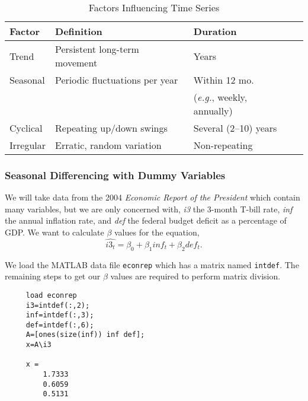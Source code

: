 \begin{table}[tbp]
	\centering
	\begin{tabular}{llll}
	\toprule
	Factor & Definition & Duration \\
	\hline
	Trend &  Persistent long-term movement & Years \\
	Seasonal & Periodic fluctuations per year & Within 12 mo. \\
	& & (\emph{e.g.}, weekly, annually) \\
	Cyclical &	Repeating up/down swings & Several (2--10) years \\
	Irregular &	 Erratic, random variation & Non-repeating \\
	\bottomrule
	\end{tabular}
	\caption{Factors Influencing Time Series}
	\label{tab:factors-ts}
\end{table}

\subsubsection{Seasonal Differencing with Dummy Variables}\label{perform-ts}
We will take data from the 2004 \emph{Economic Report of the President} which contain many variables, but we are only concerned with, \textit{i3} the 3-month T-bill rate, \textit{inf} the annual inflation rate, and \textit{def} the federal budget deficit as a percentage of GDP. We want to calculate $\beta$ values for the equation,
\begin{equation}
\widehat{i3_t} = \beta_0 + \beta_1 inf_t + \beta_2 def_t.
\label{eq:ts-regress}
\end{equation}

We load the MATLAB data file \texttt{econrep} which has a matrix named \texttt{intdef}. The remaining steps to get our $\beta$ values are required to perform matrix division.

\begin{verbatim}
     load econrep
     i3=intdef(:,2);
     inf=intdef(:,3);
     def=intdef(:,6);
     A=[ones(size(inf)) inf def];
     x=A\i3
     
     x =
         1.7333
         0.6059
         0.5131
\end{verbatim}

